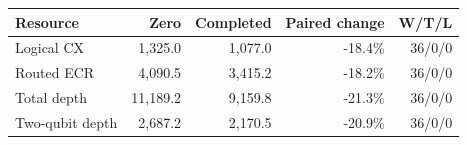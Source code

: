 \begin{tabular}{lrrrr}
\toprule
Resource & Zero & Completed & Paired change & W/T/L\\
\midrule
Logical CX & 1,325.0 & 1,077.0 & -18.4\% & 36/0/0\\
Routed ECR & 4,090.5 & 3,415.2 & -18.2\% & 36/0/0\\
Total depth & 11,189.2 & 9,159.8 & -21.3\% & 36/0/0\\
Two-qubit depth & 2,687.2 & 2,170.5 & -20.9\% & 36/0/0\\
\bottomrule
\end{tabular}
